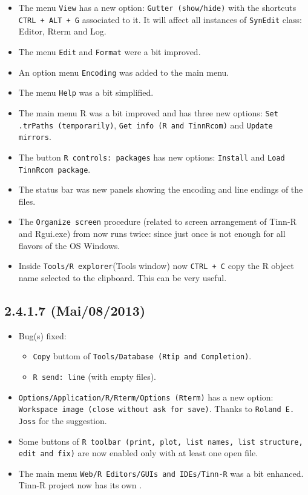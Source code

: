 \begin{itemize}
  \item The menu \texttt{View} has a new option: \texttt{Gutter (show/hide)} with the shortcuts
   \texttt{CTRL + ALT + G} associated to it. It will affect all instances of \texttt{SynEdit} class:
   Editor, Rterm and Log.
  \item The menu \texttt{Edit} and \texttt{Format} were a bit improved.
  \item An option menu \texttt{Encoding} was added to the main menu.
  \item The menu \texttt{Help} was a bit simplified.
  \item The main menu R was a bit improved and has three new options:
   \texttt{Set .trPaths (temporarily)}, \texttt{Get info (R and TinnRcom)} and \texttt{Update mirrors}.
  \item The button \texttt{R controls: packages} has new options: \texttt{Install} and
  \texttt{Load TinnRcom package}.
  \item The status bar was new panels showing the encoding and line endings of the files.
  \item The \texttt{Organize screen} procedure (related to screen arrangement of Tinn-R and Rgui.exe)
   from now runs twice: since just once is not enough for all flavors of the OS Windows.
  \item Inside \texttt{Tools/R explorer}(Tools window) now \texttt{CTRL + C} copy
   the R object name selected to the clipboard.
   This can be very useful.
\end{itemize}

\subsection{2.4.1.7 (Mai/08/2013)}
\begin{itemize}
  \item Bug(s) fixed:
    \begin{itemize}
      \item \texttt{Copy} buttom of \texttt{Tools/Database (Rtip and Completion)}.
      \item \texttt{R send: line} (with empty files).
    \end{itemize}
  \item \texttt{Options/Application/R/Rterm/Options (Rterm)} has a new option:
   \texttt{Workspace image (close without ask for save)}.
   Thanks to \texttt{Roland E. Joss} for the suggestion.
  \item Some buttons of \texttt{R toolbar (print, plot, list names, list structure, edit and fix)}
   are now enabled only with at least one open file.
  \item The main menu \texttt{Web/R Editors/GUIs and IDEs/Tinn-R} was a bit enhanced.
   Tinn-R project now has its own .
\end{itemize}

